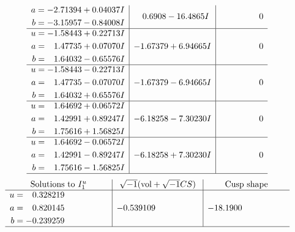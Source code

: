 \documentclass[1p]{elsarticle_modified}
\theoremstyle{definition}
\newcommand{\I}{\sqrt{-1}}
\begin{document}
$$\begin{array}{c|c|c}
\begin{aligned}
a &= -2.71394 + 0.04037 I \\
b &= -3.15957 - 0.84008 I\end{aligned}
 & \phantom{-}0.6908 - 16.4865 I & \phantom{-0.000000 } 0 \\ \hline\begin{aligned}
u &= -1.58443 + 0.22713 I \\
a &= \phantom{-}1.47735 + 0.07070 I \\
b &= \phantom{-}1.64032 - 0.65576 I\end{aligned}
 & -1.67379 + 6.94665 I & \phantom{-0.000000 } 0 \\ \hline\begin{aligned}
u &= -1.58443 - 0.22713 I \\
a &= \phantom{-}1.47735 - 0.07070 I \\
b &= \phantom{-}1.64032 + 0.65576 I\end{aligned}
 & -1.67379 - 6.94665 I & \phantom{-0.000000 } 0 \\ \hline\begin{aligned}
u &= \phantom{-}1.64692 + 0.06572 I \\
a &= \phantom{-}1.42991 + 0.89247 I \\
b &= \phantom{-}1.75616 + 1.56825 I\end{aligned}
 & -6.18258 - 7.30230 I & \phantom{-0.000000 } 0 \\ \hline\begin{aligned}
u &= \phantom{-}1.64692 - 0.06572 I \\
a &= \phantom{-}1.42991 - 0.89247 I \\
b &= \phantom{-}1.75616 - 1.56825 I\end{aligned}
 & -6.18258 + 7.30230 I & \phantom{-0.000000 } 0\\
 \hline 
 \end{array}$$\newpage$$\begin{array}{c|c|c}  
\text{Solutions to }I^u_{1}& \I (\text{vol} + \sqrt{-1}CS) & \text{Cusp shape}\\
 \hline 
\begin{aligned}
u &= \phantom{-}0.328219\phantom{ +0.000000I} \\
a &= \phantom{-}0.820145\phantom{ +0.000000I} \\
b &= -0.239259\phantom{ +0.000000I}\end{aligned}
 & -0.539109\phantom{ +0.000000I} & -18.1900\phantom{ +0.000000I}\\
 \hline 
 \end{array}$$\newpage\newpage\renewcommand{\arraystretch}{1}
\end{document}
